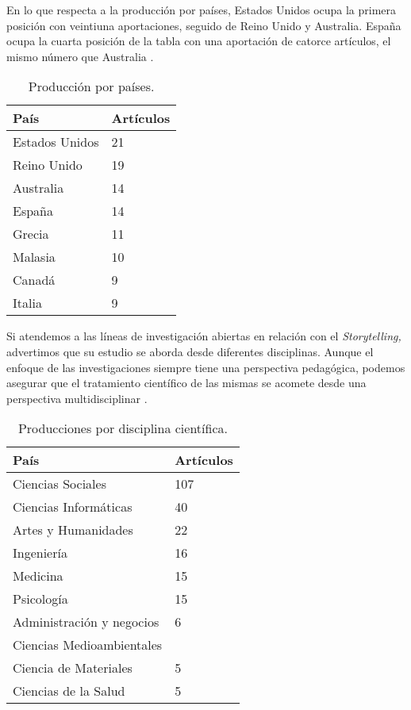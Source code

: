  En lo que respecta a la producción por países, Estados Unidos ocupa la primera posición con veintiuna aportaciones, seguido de Reino Unido y Australia. España ocupa la cuarta posición de la tabla con una aportación de catorce artículos, el mismo número que Australia .
 
\begin{table}[htbp]
\centering
\begin{threeparttable}
\caption{Producción por países.}
\label{tab-05}
\begin{tabular}{ll}
\toprule
País & Artículos \\
\midrule
Estados Unidos & 21\\
Reino Unido & 19\\
Australia & 14\\
España & 14\\
Grecia & 11\\
Malasia & 10\\
Canadá & 9 \\
Italia & 9\\ 
\bottomrule
\end{tabular}
\end{threeparttable}
\end{table}

Si atendemos a las líneas de investigación abiertas en relación con el
\emph{Storytelling,} advertimos que su estudio se aborda desde
diferentes disciplinas. Aunque el enfoque de las investigaciones siempre
tiene una perspectiva pedagógica, podemos asegurar que el tratamiento
científico de las mismas se acomete desde una perspectiva
multidisciplinar .

\begin{table}[htbp]
\centering
\begin{threeparttable}
\caption{Producciones por disciplina científica.}
\label{tab-06}
\begin{tabular}{ll}
\toprule
País & Artículos \\
\midrule
Ciencias Sociales & 107\\
Ciencias Informáticas & 40\\
Artes y Humanidades & 22\\
Ingeniería & 16\\
Medicina & 15\\
Psicología & 15\\
Administración y negocios & 6\\
Ciencias Medioambientales & \\
Ciencia de Materiales & 5\\
Ciencias de la Salud &5\\
\bottomrule
\end{tabular}
\end{threeparttable}
\end{table}

